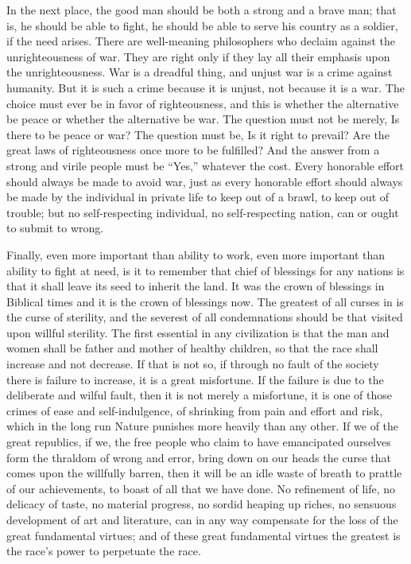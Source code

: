 \documentclass[a4paper]{amsbook}
\begin{document}
In the next place, the good man should be both a strong and a brave man; that is, he should be able to fight, he should be able to serve his country as a soldier, if the need arises. There are well-meaning philosophers who declaim against the unrighteousness of war. They are right only if they lay all their emphasis upon the unrighteousness. War is a dreadful thing, and unjust war is a crime against humanity. But it is such a crime because it is unjust, not because it is a war. The choice must ever be in favor of righteousness, and this is whether the alternative be peace or whether the alternative be war. The question must not be merely, Is there to be peace or war? The question must be, Is it right to prevail? Are the great laws of righteousness once more to be fulfilled? And the answer from a strong and virile people must be “Yes,” whatever the cost. Every honorable effort should always be made to avoid war, just as every honorable effort should always be made by the individual in private life to keep out of a brawl, to keep out of trouble; but no self-respecting individual, no self-respecting nation, can or ought to submit to wrong.

Finally, even more important than ability to work, even more important than ability to fight at need, is it to remember that chief of blessings for any nations is that it shall leave its seed to inherit the land. It was the crown of blessings in Biblical times and it is the crown of blessings now. The greatest of all curses in is the curse of sterility, and the severest of all condemnations should be that visited upon willful sterility. The first essential in any civilization is that the man and women shall be father and mother of healthy children, so that the race shall increase and not decrease. If that is not so, if through no fault of the society there is failure to increase, it is a great misfortune. If the failure is due to the deliberate and wilful fault, then it is not merely a misfortune, it is one of those crimes of ease and self-indulgence, of shrinking from pain and effort and risk, which in the long run Nature punishes more heavily than any other. If we of the great republics, if we, the free people who claim to have emancipated ourselves form the thraldom of wrong and error, bring down on our heads the curse that comes upon the willfully barren, then it will be an idle waste of breath to prattle of our achievements, to boast of all that we have done. No refinement of life, no delicacy of taste, no material progress, no sordid heaping up riches, no sensuous development of art and literature, can in any way compensate for the loss of the great fundamental virtues; and of these great fundamental virtues the greatest is the race's power to perpetuate the race.
\end{document}

